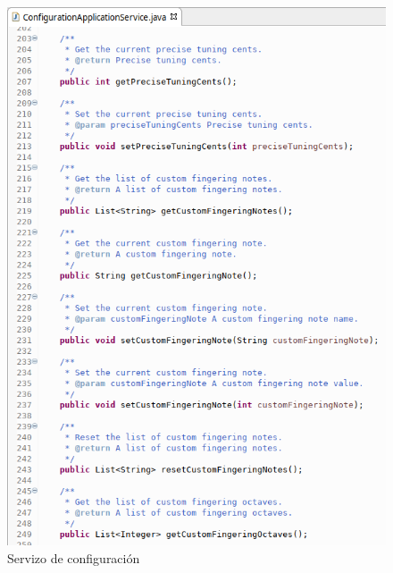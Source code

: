   \begin{figure}[htbp]
    \centering
    \includegraphics[scale=0.6, keepaspectratio=true]{./imagenes/servizo-configuracion-5.png}
    \caption{Servizo de configuración}
    \label{figura:ServizoConfiguracion5}
   \end{figure}
   
